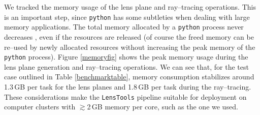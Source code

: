 \documentclass[reprint,aps,prd,superscriptaddress,showkeys,showpacs]{revtex4-1}
\newcommand{\ttt}[1]{\texttt{#1}}
\newcommand{\LT}{\texttt{LensTools} }
\begin{document}
We tracked the memory usage of the lens plane and ray--tracing operations. This is an important step, since \ttt{python} has some subtleties when dealing with large memory applications. The total memory allocated by a \ttt{python} process never decreases \citep{python}, even if the resources are released (of course the freed memory can be re--used by newly allocated resources without increasing the peak memory of the \ttt{python} process). Figure \ref{memoryfig} shows the peak memory usage during the lens plane generation and ray--tracing operations. We can see that, for the test case outlined in Table \ref{benchmarktable}, memory consumption stabilizes around 1.3\,GB per task for the lens planes and 1.8\,GB per task during the ray--tracing. These considerations make the \LT pipeline suitable for deployment on computer clusters with $\gtrsim$2\,GB memory per core, such as the one we used.    
\end{document}
